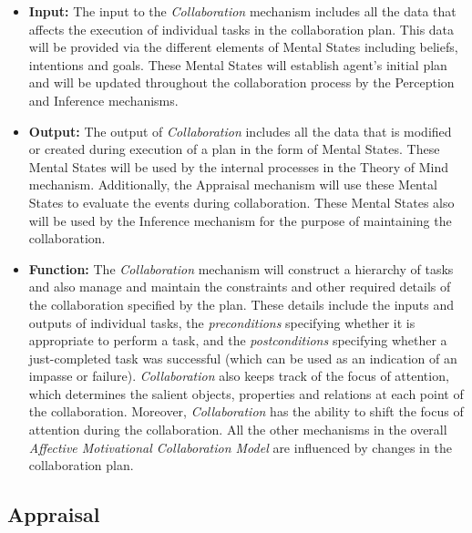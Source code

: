 \documentclass[12pt]{report}
\begin{document}
\begin{itemize}
  \item \textbf{Input:} The input to the \textit{Collaboration} mechanism
  includes all the data that affects the execution of individual tasks in the
  collaboration plan. This data will be provided via the different elements of
  Mental States including beliefs, intentions and goals. These Mental States
  will establish agent's initial plan and will be updated throughout the
  collaboration process by the Perception and Inference mechanisms.
  
  \item \textbf{Output:} The output of \textit{Collaboration} includes all the
  data that is modified or created during execution of a plan in the form of
  Mental States. These Mental States will be used by the internal processes in
  the Theory of Mind mechanism. Additionally, the Appraisal mechanism will use
  these Mental States to evaluate the events during collaboration. These Mental
  States also will be used by the Inference mechanism for the purpose of
  maintaining the collaboration.
  
  \item \textbf{Function:} The \textit{Collaboration} mechanism will construct a
  hierarchy of tasks and also manage and maintain the constraints and other
  required details of the collaboration specified by the plan. These details
  include the inputs and outputs of individual tasks, the \textit{preconditions}
  specifying whether it is appropriate to perform a task, and the
  \textit{postconditions} specifying whether a just-completed task was
  successful (which can be used as an indication of an impasse or failure).
  \textit{Collaboration} also keeps track of the focus of attention, which
  determines the salient objects, properties and relations at each point of the
  collaboration. Moreover, \textit{Collaboration} has the ability to shift the
  focus of attention during the collaboration. All the other mechanisms in the
  overall \textit{Affective Motivational Collaboration Model} are influenced by
  changes in the collaboration plan.
\end{itemize}

\subsection{Appraisal}
\end{document}
